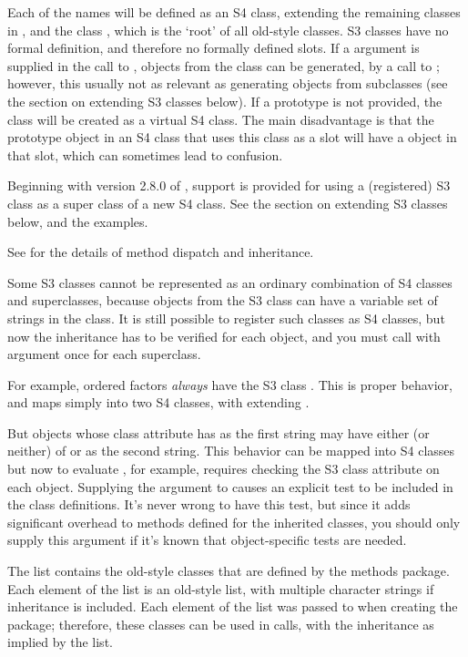 \begin{Details}\relax
Each of the names will be defined as an S4 class, extending the
remaining classes in , and the class ,
which is the `root' of all old-style classes. S3 classes have
no formal definition, and therefore no formally defined slots. If a
 argument is supplied in the call to
, objects from the class can be generated, by a
call to ; however, this usually not as relevant as
generating objects from subclasses (see the section on extending S3
classes below).   If  a prototype is not provided,
the class will be created as a virtual S4
class.
The main disadvantage is that the prototype object in an S4 class that
uses this class as a slot will have a  object in that slot,
which can sometimes lead to confusion.

Beginning with version 2.8.0 of \R{}, support is provided for using a
(registered) S3 class as a super class of a new S4 class.  See the
section on extending S3 classes below, and the examples.

See  for the details of method dispatch and
inheritance.

Some S3 classes cannot be represented as an ordinary combination of S4
classes and superclasses, because objects from the S3 class can have a
variable set of strings in the class. It is still possible to register
such classes as S4 classes, but now the inheritance has to be verified
for each object, and you must call  with argument
 once for each superclass.

For example, ordered factors \emph{always} have the S3
class .  This is proper behavior, and
maps simply into two S4 classes, with  extending
.

But objects whose class attribute has  as the first
string may have either (or neither) of  or
 as the second string.  This behavior can be mapped
into S4 classes but now to evaluate , for
example, requires checking the S3 class attribute on each object.
Supplying the  argument to  causes
an explicit test to be included in the class definitions.  It's
never wrong to have this test, but since it adds significant
overhead to methods defined for the inherited classes, you should
only supply this argument if it's known that object-specific tests
are needed.

The list  contains the old-style classes that
are defined by the methods package.  Each element of the list is an
old-style list, with multiple character strings if inheritance is
included.
Each element of the list was passed to  when
creating the  package; therefore, these classes can be used
in  calls, with the inheritance as implied by
the list.
\end{Details}
